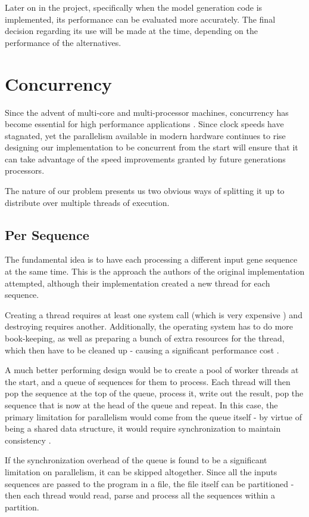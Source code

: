 Later on in the project, specifically when the model generation code is implemented, its performance can be evaluated more accurately. The final decision regarding its use will be made at the time, depending on the performance of the alternatives.

\section{Concurrency}
\label{sec:concurrency}
Since the advent of multi-core and multi-processor machines, concurrency has become essential for high performance applications \autocite{freelunch}. Since clock speeds have stagnated, yet the parallelism available in modern hardware continues to rise designing our implementation to be concurrent from the start will ensure that it can take advantage of the speed improvements granted by future generations processors.

The nature of our problem presents us two obvious ways of splitting it up to distribute over multiple threads of execution.

\subsection{Per Sequence}
 The fundamental idea is to have each processing a different input gene sequence at the same time. This is the approach the authors of the original implementation attempted, although their implementation created a new thread for each sequence.

 Creating a thread requires at least one system call (which is very expensive \autocite{syscalls}) and destroying requires another. Additionally, the operating system has to do more book-keeping, as well as preparing a bunch of extra resources for the thread, which then have to be cleaned up - causing a significant performance cost \autocite{threads}.

 A much better performing design would be to create a pool of worker threads at the start, and a queue of sequences for them to process. Each thread will then pop the sequence at the top of the queue, process it, write out the result, pop the sequence that is now at the head of the queue and repeat. In this case, the primary limitation for parallelism would come from the queue itself - by virtue of being a shared data structure, it would require synchronization to maintain consistency \autocite{concurrency}.

 If the synchronization overhead of the queue is found to be a significant limitation on parallelism, it can be skipped altogether. Since all the inputs sequences are passed to the program in a file, the file itself can be partitioned - then each thread would read, parse and process all the sequences within a partition.

